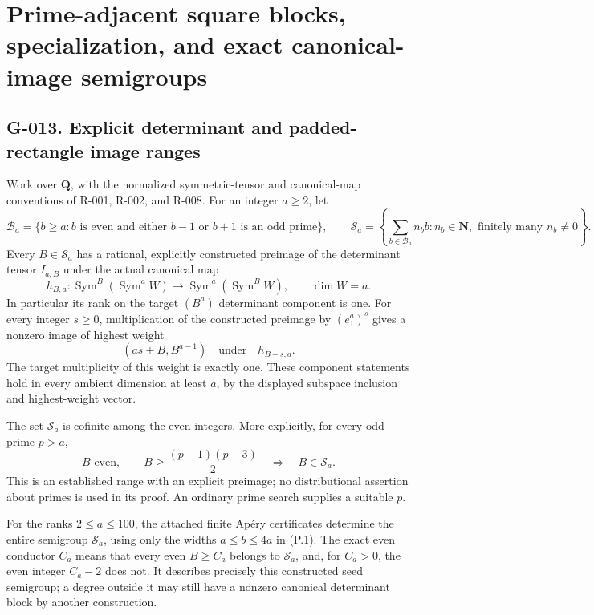 \documentclass[
  10pt,
]{article}
\begin{document}
\section{Prime-adjacent square blocks, specialization, and exact
canonical-image
semigroups}\label{prime-adjacent-square-blocks-specialization-and-exact-canonical-image-semigroups}

\subsection{G-013. Explicit determinant and padded-rectangle image
ranges}\label{g-013.-explicit-determinant-and-padded-rectangle-image-ranges}

Work over \(\mathbf Q\), with the normalized symmetric-tensor and
canonical-map conventions of R-001, R-002, and R-008. For an integer
\(a\ge2\), let \[
\mathcal B_a=\{b\ge a: b\text{ is even and either }b-1\text{ or }b+1\text{ is an odd prime}\},
\qquad
\mathcal S_a=\left\{\sum_{b\in\mathcal B_a}n_b b:n_b\in\mathbf N,
\text{ finitely many }n_b\ne0\right\}.
\tag{P.1}
\] Every \(B\in\mathcal S_a\) has a rational, explicitly constructed
preimage of the determinant tensor \(I_{a,B}\) under the actual
canonical map \[
 h_{B,a}:\operatorname{Sym}^B(\operatorname{Sym}^a W)
 \longrightarrow\operatorname{Sym}^a(\operatorname{Sym}^B W),\qquad \dim W=a.
\tag{P.2}
\] In particular its rank on the target \((B^a)\) determinant component
is one. For every integer \(s\ge0\), multiplication of the constructed
preimage by \((e_1^a)^s\) gives a nonzero image of highest weight \[
 (as+B,B^{a-1})
\quad\text{under}\quad h_{B+s,a}.
\tag{P.3}
\] The target multiplicity of this weight is exactly one. These
component statements hold in every ambient dimension at least \(a\), by
the displayed subspace inclusion and highest-weight vector.

The set \(\mathcal S_a\) is cofinite among the even integers. More
explicitly, for every odd prime \(p>a\), \[
 B\text{ even},\qquad B\ge \frac{(p-1)(p-3)}2
 \quad\Longrightarrow\quad B\in\mathcal S_a.
\tag{P.4}
\] This is an established range with an explicit preimage; no
distributional assertion about primes is used in its proof. An ordinary
prime search supplies a suitable \(p\).

For the ranks \(2\le a\le100\), the attached finite Apéry certificates
determine the entire semigroup \(\mathcal S_a\), using only the widths
\(a\le b\le4a\) in (P.1). The exact even conductor \(C_a\) means that
every even \(B\ge C_a\) belongs to \(\mathcal S_a\), and, for \(C_a>0\),
the even integer \(C_a-2\) does not. It describes precisely this
constructed seed semigroup; a degree outside it may still have a nonzero
canonical determinant block by another construction.
\end{document}
